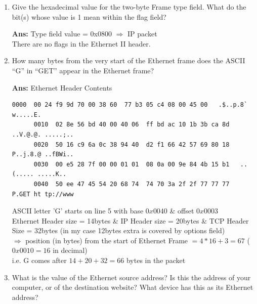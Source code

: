 \documentclass[a4,11pt]{article}
\newenvironment{que}
{ \color{ForestGreen}
  \begin{question}
}
{ \end{question} }
\newenvironment{sol}
{ \color{Black}
  \begin{solution}
}
{ \end{solution} }
\begin{document}
\begin{enumerate}
  \item
  \begin{que}
   Give the hexadecimal value for the two-byte Frame type field. What do the bit(s) whose value is 1 mean within the flag field?
  \end{que}
  
  \begin{sol}
   \textbf{Ans:} Type field value = 0x0800 $\Rightarrow$ IP packet \\
	    There are no flags in the Ethernet II header.
  \end{sol}
  
  \item 
  \begin{que}
   How many bytes from the very start of the Ethernet frame does the ASCII “G” in “GET” appear in the Ethernet frame?
  \end{que}

  \begin{sol}
   \textbf{Ans:} Ethernet Header Contents
   \begin{adjustwidth}{-2cm}{}
    \begin{lstlisting}[style=bash]
      0000  00 24 f9 9d 70 00 38 60  77 b3 05 c4 08 00 45 00   .$..p.8` w.....E.
      0010  02 8e 56 bd 40 00 40 06  ff bd ac 10 1b 3b ca 8d   ..V.@.@. .....;..
      0020  50 16 c9 6a 0c 38 94 40  d2 f1 66 42 57 69 80 18   P..j.8.@ ..fBWi..
      0030  00 e5 28 7f 00 00 01 01  08 0a 00 9e 84 4b 15 b1   ..(..... .....K..
      0040  50 ee 47 45 54 20 68 74  74 70 3a 2f 2f 77 77 77   P.GET ht tp://www
    \end{lstlisting}
    \end{adjustwidth}
    
    ASCII letter 'G' starts on line 5 with base $0x0040$ \& offset $0x0003$ \\
    Ethernet Header size = 14bytes \& IP Header size = 20bytes \& TCP Header Size = 32bytes (in my case 12bytes extra is covered by options field) \\
    $\Rightarrow$ position (in bytes) from the start of Ethernet Frame $= 4*16+3 = 67$ ($0x0010 = 16$ in decimal) \\
    i.e. G comes after $14+20+32 = 66$ bytes in the packet   
  \end{sol}

  \item 
  \begin{que}
   What is the value of the Ethernet source address? 
   Is this the address of your computer, or of the destination website?  What device has this as its Ethernet address?
  \end{que}


\end{enumerate}
\end{document}
